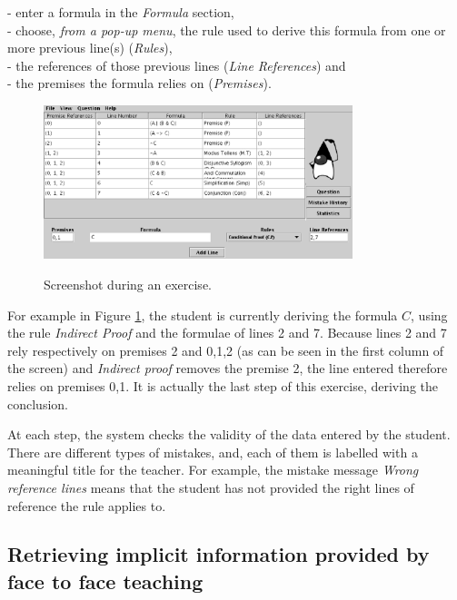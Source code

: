 \noindent
- enter a formula in the {\em Formula} section, \\
- choose, {\em  from a pop-up menu}, the rule used to derive this formula from one or more previous line(s) ({\em Rules}), \\
- the references of those previous lines ({\em  Line References}) and \\
- the premises the formula relies on ({\em  Premises}). 


\begin{figure}
{\includegraphics[width=9cm]{screenshot.eps}}
\caption{Screenshot during an exercise.}
\label{screen}
\end{figure}

For example in Figure \ref{screen}, the student is currently deriving the formula $C$, using the rule {\em Indirect Proof} and the formulae of lines 2 and 7. Because lines 2 and 7 rely respectively on premises {2} and {0,1,2} (as can be seen in the first column of the screen) and {\em Indirect proof} removes the premise 2, the line entered therefore relies on premises {0,1}. It is actually the last step of this exercise, deriving the conclusion. 

At each step, the system checks the validity of the data entered by the student. There are different types of mistakes, and, each of them is labelled with a meaningful title for the teacher. For example, the mistake message {\em Wrong reference lines} means that the student has not provided the right lines of reference the rule applies to. 
  

\subsection{Retrieving implicit information provided by face to face teaching}


